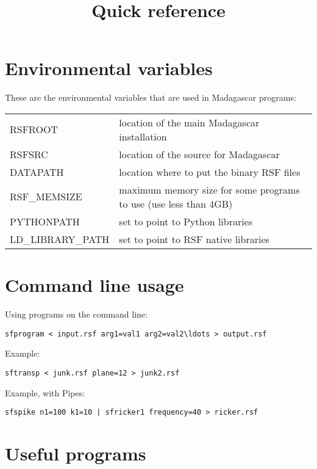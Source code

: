 \title{Quick reference}
\section{Environmental variables}

These are the environmental variables that are used in Madagascar programs:

\begin{tabular}{| l | l |}
    \hline
    RSFROOT & location of the main Madagascar installation \\
    RSFSRC & location of the source for Madagascar \\
    DATAPATH & location where to put the binary RSF files \\
    RSF\_MEMSIZE & maximum memory size for some programs to use (use less than 4GB) \\
    PYTHONPATH & set to point to Python libraries \\
    LD\_LIBRARY\_PATH & set to point to RSF native libraries \\
    \hline
\end{tabular}

\section{Command line usage}

Using programs on the command line:
\begin{verbatim}
sfprogram < input.rsf arg1=val1 arg2=val2\ldots > output.rsf
\end{verbatim}
Example:
\begin{verbatim}
sftransp < junk.rsf plane=12 > junk2.rsf
\end{verbatim}
Example, with Pipes:
\begin{verbatim}
sfspike n1=100 k1=10 | sfricker1 frequency=40 > ricker.rsf
\end{verbatim}

\section{Useful programs}

